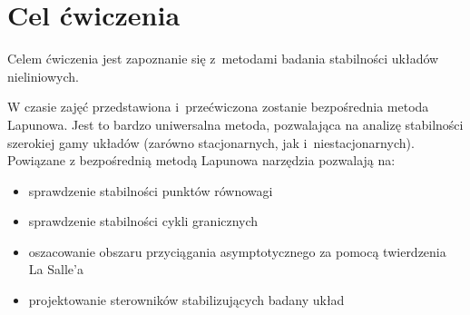 \documentclass{sprawozdanie-agh}
\begin{document}

\stronatytulowa{}

\section{Cel ćwiczenia}
Celem ćwiczenia jest zapoznanie się z~metodami badania stabilności układów nieliniowych.

W czasie zajęć przedstawiona i~przećwiczona zostanie bezpośrednia metoda
Lapunowa. Jest to bardzo uniwersalna metoda, pozwalająca na analizę stabilności szerokiej
gamy układów (zarówno stacjonarnych, jak i~niestacjonarnych).
Powiązane z bezpośrednią metodą Lapunowa narzędzia pozwalają na:
\begin{itemize}
    \item sprawdzenie stabilności punktów równowagi
    \item sprawdzenie stabilności cykli granicznych
    \item oszacowanie obszaru przyciągania asymptotycznego za pomocą twierdzenia La Salle'a
    \item projektowanie sterowników stabilizujących badany układ
\end{itemize}
\end{document}
